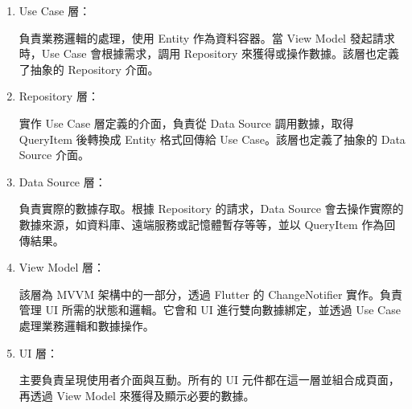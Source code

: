 \begin{enumerate}

    \item Use Case 層：

    負責業務邏輯的處理，使用 Entity 作為資料容器。當 View Model 發起請求時，Use Case 會根據需求，調用 Repository 來獲得或操作數據。該層也定義了抽象的 Repository 介面。

    \item Repository 層：

    實作 Use Case 層定義的介面，負責從 Data Source 調用數據，取得 QueryItem 後轉換成 Entity 格式回傳給 Use Case。該層也定義了抽象的 Data Source 介面。

    \item Data Source 層：

    負責實際的數據存取。根據 Repository 的請求，Data Source 會去操作實際的數據來源，如資料庫、遠端服務或記憶體暫存等等，並以 QueryItem 作為回傳結果。

    \item View Model 層：

    該層為 MVVM 架構中的一部分，透過 Flutter 的 ChangeNotifier 實作。負責管理 UI 所需的狀態和邏輯。它會和 UI 進行雙向數據綁定，並透過 Use Case 處理業務邏輯和數據操作。

    \item UI 層：

    主要負責呈現使用者介面與互動。所有的 UI 元件都在這一層並組合成頁面，再透過 View Model 來獲得及顯示必要的數據。

\end{enumerate}
